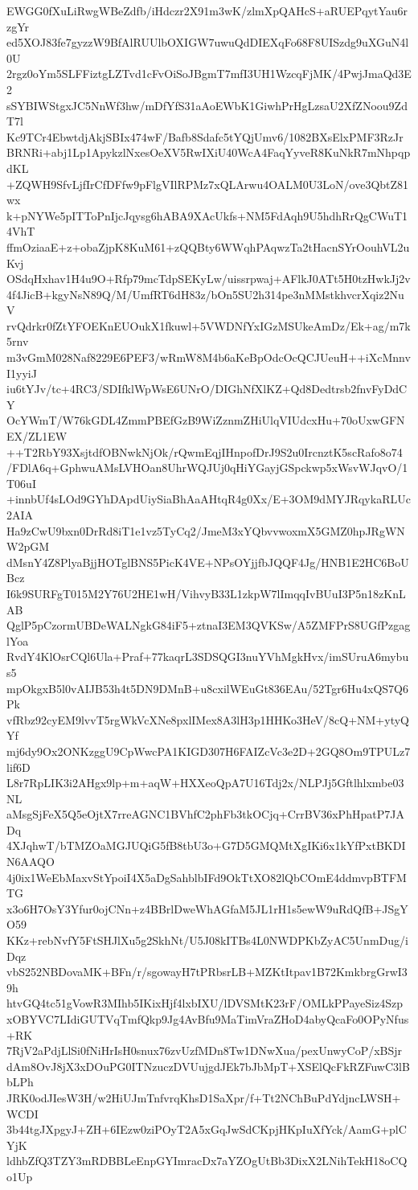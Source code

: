 EWGG0fXuLiRwgWBeZdfb/iHdczr2X91m3wK/zlmXpQAHcS+aRUEPqytYau6rzgYr
ed5XOJ83fe7gyzzW9BfAlRUUlbOXIGW7uwuQdDIEXqFo68F8UISzdg9uXGuN4l0U
2rgz0oYm5SLFFiztgLZTvd1cFvOiSoJBgmT7mfI3UH1WzcqFjMK/4PwjJmaQd3E2
sSYBIWStgxJC5NnWf3hw/mDfYfS31aAoEWbK1GiwhPrHgLzsaU2XfZNoou9ZdT7l
Kc9TCr4EbwtdjAkjSBIx474wF/Bafb8Sdafc5tYQjUmv6/1082BXsElxPMF3RzJr
BRNRi+abj1Lp1ApykzlNxesOeXV5RwIXiU40WcA4FaqYyveR8KuNkR7mNhpqpdKL
+ZQWH9SfvLjfIrCfDFfw9pFlgVIlRPMz7xQLArwu4OALM0U3LoN/ove3QbtZ81wx
k+pNYWe5pITToPnIjcJqysg6hABA9XAcUkfs+NM5FdAqh9U5hdhRrQgCWuT14VhT
ffmOziaaE+z+obaZjpK8KuM61+zQQBty6WWqhPAqwzTa2tHacnSYrOouhVL2uKvj
OSdqHxhav1H4u9O+Rfp79mcTdpSEKyLw/uissrpwaj+AFlkJ0ATt5H0tzHwkJj2v
4f4JicB+kgyNsN89Q/M/UmfRT6dH83z/bOn5SU2h314pe3nMMstkhvcrXqiz2NuV
rvQdrkr0fZtYFOEKnEUOukX1fkuwl+5VWDNfYxIGzMSUkeAmDz/Ek+ag/m7k5rnv
m3vGmM028Naf8229E6PEF3/wRmW8M4b6aKeBpOdcOcQCJUeuH++iXcMnnvI1yyiJ
iu6tYJv/tc+4RC3/SDIfklWpWsE6UNrO/DIGhNfXlKZ+Qd8Dedtrsb2fnvFyDdCY
OcYWmT/W76kGDL4ZmmPBEfGzB9WiZznmZHiUlqVIUdcxHu+70oUxwGFNEX/ZL1EW
++T2RbY93XsjtdfOBNwkNjOk/rQwmEqjIHnpofDrJ9S2u0IrcnztK5scRafo8o74
/FDlA6q+GphwuAMsLVHOan8UhrWQJUj0qHiYGayjGSpckwp5xWsvWJqvO/1T06uI
+innbUf4sLOd9GYhDApdUiySiaBhAaAHtqR4g0Xx/E+3OM9dMYJRqykaRLUc2AIA
Ha9zCwU9bxn0DrRd8iT1e1vz5TyCq2/JmeM3xYQbvvwoxmX5GMZ0hpJRgWNW2pGM
dMsnY4Z8PlyaBjjHOTglBNS5PicK4VE+NPsOYjjfbJQQF4Jg/HNB1E2HC6BoUBcz
I6k9SURFgT015M2Y76U2HE1wH/VihvyB33L1zkpW7lImqqIvBUuI3P5n18zKnLAB
QglP5pCzormUBDeWALNgkG84iF5+ztnaI3EM3QVKSw/A5ZMFPrS8UGfPzgaglYoa
RvdY4KlOsrCQl6Ula+Praf+77kaqrL3SDSQGI3nuYVhMgkHvx/imSUruA6mybus5
mpOkgxB5l0vAIJB53h4t5DN9DMnB+u8cxilWEuGt836EAu/52Tgr6Hu4xQS7Q6Pk
vfRbz92cyEM9lvvT5rgWkVcXNe8pxlIMex8A3lH3p1HHKo3HeV/8cQ+NM+ytyQYf
mj6dy9Ox2ONKzggU9CpWwcPA1KIGD307H6FAIZcVc3e2D+2GQ8Om9TPULz7lif6D
L8r7RpLIK3i2AHgx9lp+m+aqW+HXXeoQpA7U16Tdj2x/NLPJj5Gftlhlxmbe03NL
aMsgSjFeX5Q5eOjtX7rreAGNC1BVhfC2phFb3tkOCjq+CrrBV36xPhHpatP7JADq
4XJqhwT/bTMZOaMGJUQiG5fB8tbU3o+G7D5GMQMtXgIKi6x1kYfPxtBKDIN6AAQO
4j0ix1WeEbMaxvStYpoiI4X5aDgSahblbIFd9OkTtXO82lQbCOmE4ddmvpBTFMTG
x3o6H7OsY3Yfur0ojCNn+z4BBrlDweWhAGfaM5JL1rH1s5ewW9uRdQfB+JSgYO59
KKz+rebNvfY5FtSHJlXu5g2SkhNt/U5J08kITBs4L0NWDPKbZyAC5UnmDug/iDqz
vbS252NBDovaMK+BFn/r/sgowayH7tPRbsrLB+MZKtItpav1B72KmkbrgGrwI39h
htvGQ4tc51gVowR3MIhb5IKixHjf4lxbIXU/lDVSMtK23rF/OMLkPPayeSiz4Szp
xOBYVC7LIdiGUTVqTmfQkp9Jg4AvBfu9MaTimVraZHoD4abyQcaFo0OPyNfus+RK
7RjV2aPdjLlSi0fNiHrIsH0snux76zvUzfMDn8Tw1DNwXua/pexUnwyCoP/xBSjr
dAm8OvJ8jX3xDOuPG0ITNzuczDVUujgdJEk7bJbMpT+XSElQcFkRZFuwC3lBbLPh
JRK0odJIesW3H/w2HiUJmTnfvrqKhsD1SaXpr/f+Tt2NChBuPdYdjncLWSH+WCDI
3b44tgJXpgyJ+ZH+6IEzw0ziPOyT2A5xGqJwSdCKpjHKpIuXfYck/AamG+plCYjK
ldhbZfQ3TZY3mRDBBLeEnpGYImracDx7aYZOgUtBb3DixX2LNihTekH18oCQo1Up
